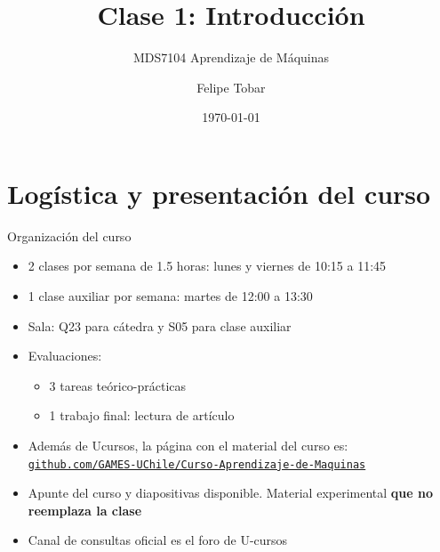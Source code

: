 \documentclass[9pt]{beamer}
\title{Clase 1: Introducción}
\subtitle{MDS7104 Aprendizaje de Máquinas}
\date{\today}
\author{Felipe Tobar}
\institute{Iniciativa de Datos e Inteligencia Artificial\\Universidad de Chile}
\begin{document}
\begin{frame}
  \titlepage
\end{frame}

\section{Logística y presentación del curso}
\begin{frame}{Organización del curso}

\begin{itemize}
  \item 2 clases por semana de 1.5 horas: lunes y viernes de 10:15 a 11:45 
  \item 1 clase auxiliar por semana: martes de 12:00 a 13:30
  \item Sala: Q23 para cátedra y S05 para clase auxiliar
  \item Evaluaciones: 
  \begin{itemize}
    \item 3 tareas teórico-prácticas 
    \item 1 trabajo final: lectura de artículo 
  \end{itemize}
  \item Además de Ucursos, la página con el material del curso es: \href{https://github.com/GAMES-UChile/Curso-Aprendizaje-de-Maquinas}{\tt github.com/GAMES-UChile/Curso-Aprendizaje-de-Maquinas}
  \item Apunte del curso y diapositivas disponible. Material experimental \textbf{que no reemplaza la clase}
  \item Canal de consultas oficial es el foro de U-cursos
\end{itemize}

\end{frame}
\end{document}
